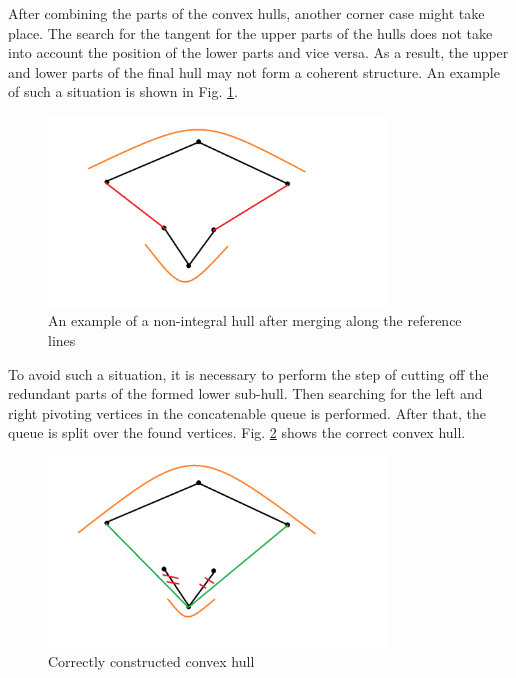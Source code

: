 \documentclass[a4paper,english,numberwithinsect,notab]{eurocg20-submission}
\begin{document}
	After combining the parts of the convex hulls, another corner case might take place. The search for the tangent for the upper parts of the hulls does not take into account the position of the lower parts and vice versa. As a result, the upper and lower parts of the final hull may not form a coherent structure. An example of such a situation is shown in Fig. \ref{fig:incorect_lower_subhull}.
	
	\begin{figure}[t]
		\centering
		\includegraphics[width=0.8\textwidth, height=0.3\textheight]{incorect_lower_subhull}
		\caption{An example of a non-integral hull after merging along the reference lines}
		\label{fig:incorect_lower_subhull}
	\end{figure}
	
	To avoid such a situation, it is necessary to perform the step of cutting off the redundant parts of the formed lower sub-hull. Then searching for the left and right pivoting vertices in the concatenable queue is performed. After that, the queue is split over the found vertices. Fig. \ref{fig:correct_convex_hull} shows the correct convex hull.
	
	\begin{figure}[t]
		\centering
		\includegraphics[width=0.8\textwidth, height=0.3\textheight]{correct_convex_hull}
		\caption{Correctly constructed convex hull}
		\label{fig:correct_convex_hull}
	\end{figure}
\end{document}
